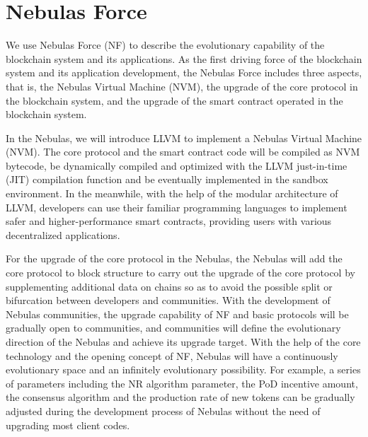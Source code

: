 \section{Nebulas Force}
\label{sec:nebulasforce}

We use Nebulas Force (NF) to describe the evolutionary capability of the blockchain system and its applications. As the first driving force of the blockchain system and its application development, the Nebulas Force includes three aspects, that is, the Nebulas Virtual Machine (NVM), the upgrade of the core protocol in the blockchain system, and the upgrade of the smart contract operated in the blockchain system.


In the Nebulas, we will introduce LLVM to implement a Nebulas Virtual Machine (NVM). The core protocol and the smart contract code will be compiled as NVM bytecode, be dynamically compiled and optimized with the LLVM just-in-time (JIT) compilation function and be eventually implemented in the sandbox environment. In the meanwhile, with the help of the modular architecture of LLVM, developers can use their familiar programming languages to implement safer and higher-performance smart contracts, providing users with various decentralized applications. 


For the upgrade of the core protocol in the Nebulas, the Nebulas will add the core protocol to block structure to carry out the upgrade of the core protocol by supplementing additional data on chains so as to avoid the possible split or bifurcation between developers and communities. With the development of Nebulas communities, the upgrade capability of NF and basic protocols will be gradually open to communities, and communities will define the evolutionary direction of the Nebulas and achieve its upgrade target. With the help of the core technology and the opening concept of NF, Nebulas will have a continuously evolutionary space and an infinitely evolutionary possibility. For example, a series of parameters including the NR algorithm parameter, the PoD incentive amount, the consensus algorithm and the production rate of new tokens can be gradually adjusted during the development process of Nebulas without the need of upgrading most client codes.

